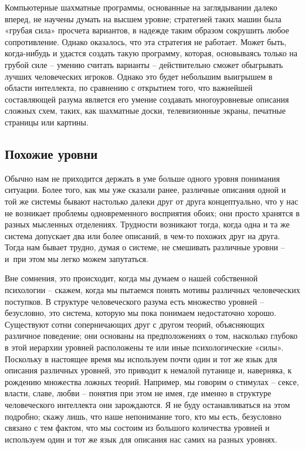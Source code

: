 \documentclass[../main.tex]{subfiles}
\begin{document}
Компьютерные шахматные программы, основанные на заглядывании далеко вперед, не научены думать на высшем уровне; стратегией таких машин была «грубая сила» просчета вариантов, в надежде таким образом сокрушить любое сопротивление. Однако оказалось, что эта стратегия не работает. Может быть, когда-нибудь и удастся создать такую программу, которая, основываясь только на грубой силе \--- умению считать варианты \--- действительно сможет обыгрывать лучших человеческих игроков. Однако это будет небольшим выигрышем в области интеллекта, по сравнению с открытием того, что важнейшей составляющей разума является его умение создавать многоуровневые описания сложных схем, таких, как шахматные доски, телевизионные экраны, печатные страницы или картины.


\subsection{Похожие уровни}

Обычно нам не приходится держать в уме больше одного уровня понимания ситуации. Более того, как мы уже сказали ранее, различные описания одной и той же системы бывают настолько далеки друг от друга концептуально, что у нас не возникает проблемы одновременного восприятия обоих; они просто хранятся в разных мысленных отделениях. Трудности возникают тогда, когда одна и та же система допускает два или более описаний, в чем-то похожих друг на друга. Тогда нам бывает трудно, думая о системе, не смешивать различные уровни \--- и~при этом мы легко можем запутаться.

Вне сомнения, это происходит, когда мы думаем о нашей собственной психологии \--- скажем, когда мы пытаемся понять мотивы различных человеческих поступков. В структуре человеческого разума есть множество уровней \--- безусловно, это система, которую мы пока понимаем недостаточно хорошо. Существуют сотни соперничающих друг с другом теорий, объясняющих различное поведение; они основаны на предположениях о том, насколько глубоко в этой иерархии уровней расположены те или иные психологические «силы». Поскольку в настоящее время мы используем почти один и тот же язык для описания различных уровней, это приводит к немалой путанице и, наверняка, к рождению множества ложных теорий. Например, мы говорим о стимулах \--- сексе, власти, славе, любви \--- понятия при этом не имея, где именно в структуре человеческого интеллекта они зарождаются. Я не буду останавливаться на этом подробно; скажу лишь, что наше непонимание того, кто мы есть, безусловно связано с тем фактом, что мы состоим из большого количества уровней и используем один и тот же язык для описания нас самих на разных уровнях.
\end{document}
